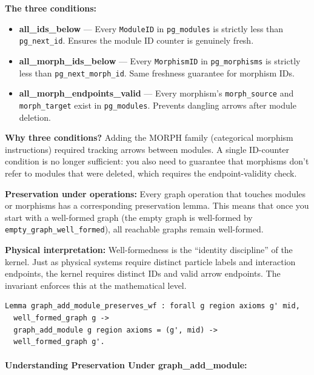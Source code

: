 \textbf{The three conditions:}
\begin{itemize}
    \item \textbf{all\_ids\_below} — Every \texttt{ModuleID} in \texttt{pg\_modules} is strictly less than \texttt{pg\_next\_id}. Ensures the module ID counter is genuinely fresh.
    \item \textbf{all\_morph\_ids\_below} — Every \texttt{MorphismID} in \texttt{pg\_morphisms} is strictly less than \texttt{pg\_next\_morph\_id}. Same freshness guarantee for morphism IDs.
    \item \textbf{all\_morph\_endpoints\_valid} — Every morphism's \texttt{morph\_source} and \texttt{morph\_target} exist in \texttt{pg\_modules}. Prevents dangling arrows after module deletion.
\end{itemize}

\textbf{Why three conditions?} Adding the MORPH family (categorical morphism instructions) required tracking arrows between modules. A single ID-counter condition is no longer sufficient: you also need to guarantee that morphisms don't refer to modules that were deleted, which requires the endpoint-validity check.

\textbf{Preservation under operations:} Every graph operation that touches modules or morphisms has a corresponding preservation lemma. This means that once you start with a well-formed graph (the empty graph is well-formed by \texttt{empty\_graph\_well\_formed}), all reachable graphs remain well-formed.

\textbf{Physical interpretation:} Well-formedness is the ``identity discipline'' of the kernel. Just as physical systems require distinct particle labels and interaction endpoints, the kernel requires distinct IDs and valid arrow endpoints. The invariant enforces this at the mathematical level.

\begin{theorem}
\begin{lstlisting}
Lemma graph_add_module_preserves_wf : forall g region axioms g' mid,
  well_formed_graph g ->
  graph_add_module g region axioms = (g', mid) ->
  well_formed_graph g'.
\end{lstlisting}
\end{theorem}

\paragraph{Understanding Preservation Under graph\_add\_module:}


